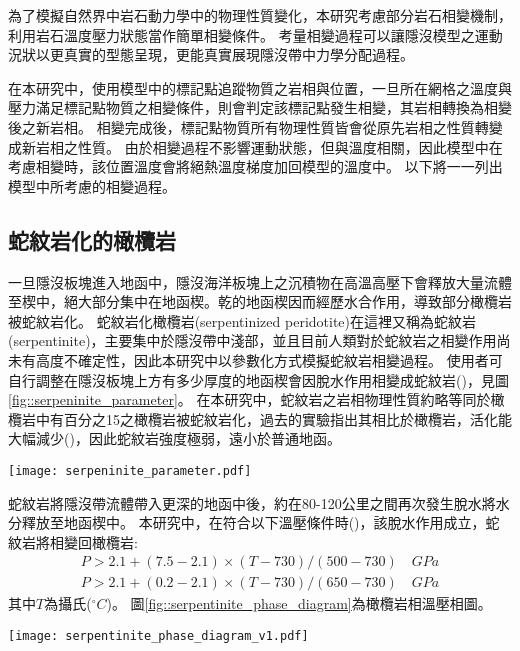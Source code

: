 為了模擬自然界中岩石動力學中的物理性質變化，本研究考慮部分岩石相變機制，利用岩石溫度壓力狀態當作簡單相變條件。
考量相變過程可以讓隱沒模型之運動況狀以更真實的型態呈現，更能真實展現隱沒帶中力學分配過程。

在本研究中，使用模型中的標記點追蹤物質之岩相與位置，一旦所在網格之溫度與壓力滿足標記點物質之相變條件，則會判定該標記點發生相變，其岩相轉換為相變後之新岩相。
相變完成後，標記點物質所有物理性質皆會從原先岩相之性質轉變成新岩相之性質。
由於相變過程不影響運動狀態，但與溫度相關，因此模型中在考慮相變時，該位置溫度會將絕熱溫度梯度加回模型的溫度中。
以下將一一列出模型中所考慮的相變過程。

\subsection{蛇紋岩化的橄欖岩}\label{蛇紋岩化的橄欖岩}
一旦隱沒板塊進入地函中，隱沒海洋板塊上之沉積物在高溫高壓下會釋放大量流體至楔中，絕大部分集中在地函楔。乾的地函楔因而經歷水合作用，導致部分橄欖岩被蛇紋岩化。
蛇紋岩化橄欖岩(serpentinized peridotite)在這裡又稱為蛇紋岩(serpentinite)，主要集中於隱沒帶中淺部，並且目前人類對於蛇紋岩之相變作用尚未有高度不確定性，因此本研究中以參數化方式模擬蛇紋岩相變過程。
使用者可自行調整在隱沒板塊上方有多少厚度的地函楔會因脫水作用相變成蛇紋岩(\citealp{Tan2012})，見圖\ref{fig::serpeninite_parameter}。
在本研究中，蛇紋岩之岩相物理性質約略等同於橄欖岩中有百分之15之橄欖岩被蛇紋岩化，過去的實驗指出其相比於橄欖岩，活化能大幅減少(\citealp{hilairet2007high})，因此蛇紋岩強度極弱，遠小於普通地函。

\begin{figure*}[ht!]
    \centering
    \texttt{[image: serpeninite\_parameter.pdf]}
    \caption[蛇紋岩參數化示意圖]{蛇紋岩參數化示意圖。於模型隱沒板塊上，海洋地殼玄武岩相變成榴輝岩深度後25公里深之上的地函會生成h公里厚的蛇紋岩。}
    \label{fig::serpeninite_parameter}
\end{figure*}

蛇紋岩將隱沒帶流體帶入更深的地函中後，約在80-120公里之間再次發生脫水將水分釋放至地函楔中。
本研究中，在符合以下溫壓條件時(\citealp{Ulmer1995})，該脫水作用成立，蛇紋岩將相變回橄欖岩:
\begin{align}
P > 2.1 + (7.5-2.1)\times (T-730)/(500-730) \quad GPa \\
P > 2.1 + (0.2-2.1) \times (T-730)/(650-730) \quad GPa
\end{align}
其中$T$為攝氏($^\circ C$)。
圖\ref{fig::serpentinite_phase_diagram}為橄欖岩相溫壓相圖。
\begin{figure*}[h!]
    \centering
    \texttt{[image: serpentinite\_phase\_diagram\_v1.pdf]}
    \caption[橄欖岩相圖，參考\citet{Ulmer1995}]{橄欖岩相圖。紫線代表蛇紋岩脫水回橄欖岩之相變圖，參考\citet{Ulmer1995}。綠線與黃線分別代表橄欖岩的乾固相線(dry solidus)與含水固相線(wet solidus)，摘自\citet{katz2003new}。另用灰線實線與虛線分別表示墨西哥參考模型之海洋岩石圈與大陸岩石圈地溫梯度。}
    \label{fig::serpentinite_phase_diagram}
\end{figure*}

